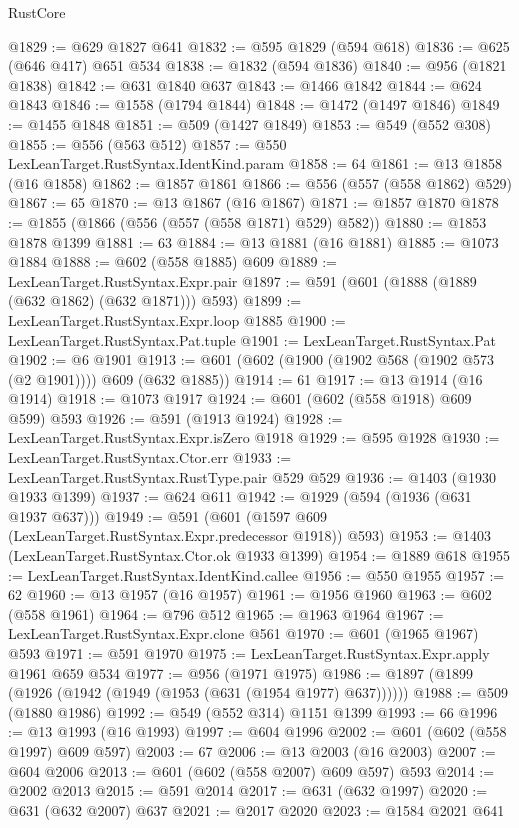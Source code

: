 \begin{lexlean}{RustCore}
\begin{coremodule}
@1829 := @629 @1827 @641
@1832 := @595 @1829 (@594 @618)
@1836 := @625 (@646 @417) @651 @534
@1838 := @1832 (@594 @1836)
@1840 := @956 (@1821 @1838)
@1842 := @631 @1840 @637
@1843 := @1466 @1842
@1844 := @624 @1843
@1846 := @1558 (@1794 @1844)
@1848 := @1472 (@1497 @1846)
@1849 := @1455 @1848
@1851 := @509 (@1427 @1849)
@1853 := @549 (@552 @308)
@1855 := @556 (@563 @512)
@1857 := @550 LexLeanTarget.RustSyntax.IdentKind.param
@1858 := 64
@1861 := @13 @1858 (@16 @1858)
@1862 := @1857 @1861
@1866 := @556 (@557 (@558 @1862) @529)
@1867 := 65
@1870 := @13 @1867 (@16 @1867)
@1871 := @1857 @1870
@1878 := @1855 (@1866 (@556 (@557 (@558 @1871) @529) @582))
@1880 := @1853 @1878 @1399
@1881 := 63
@1884 := @13 @1881 (@16 @1881)
@1885 := @1073 @1884
@1888 := @602 (@558 @1885) @609
@1889 := LexLeanTarget.RustSyntax.Expr.pair
@1897 := @591 (@601 (@1888 (@1889 (@632 @1862) (@632 @1871))) @593)
@1899 := LexLeanTarget.RustSyntax.Expr.loop @1885
@1900 := LexLeanTarget.RustSyntax.Pat.tuple
@1901 := LexLeanTarget.RustSyntax.Pat
@1902 := @6 @1901
@1913 := @601 (@602 (@1900 (@1902 @568 (@1902 @573 (@2 @1901)))) @609 (@632 @1885))
@1914 := 61
@1917 := @13 @1914 (@16 @1914)
@1918 := @1073 @1917
@1924 := @601 (@602 (@558 @1918) @609 @599) @593
@1926 := @591 (@1913 @1924)
@1928 := LexLeanTarget.RustSyntax.Expr.isZero @1918
@1929 := @595 @1928
@1930 := LexLeanTarget.RustSyntax.Ctor.err
@1933 := LexLeanTarget.RustSyntax.RustType.pair @529 @529
@1936 := @1403 (@1930 @1933 @1399)
@1937 := @624 @611
@1942 := @1929 (@594 (@1936 (@631 @1937 @637)))
@1949 := @591 (@601 (@1597 @609 (LexLeanTarget.RustSyntax.Expr.predecessor @1918)) @593)
@1953 := @1403 (LexLeanTarget.RustSyntax.Ctor.ok @1933 @1399)
@1954 := @1889 @618
@1955 := LexLeanTarget.RustSyntax.IdentKind.callee
@1956 := @550 @1955
@1957 := 62
@1960 := @13 @1957 (@16 @1957)
@1961 := @1956 @1960
@1963 := @602 (@558 @1961)
@1964 := @796 @512
@1965 := @1963 @1964
@1967 := LexLeanTarget.RustSyntax.Expr.clone @561
@1970 := @601 (@1965 @1967) @593
@1971 := @591 @1970
@1975 := LexLeanTarget.RustSyntax.Expr.apply @1961 @659 @534
@1977 := @956 (@1971 @1975)
@1986 := @1897 (@1899 (@1926 (@1942 (@1949 (@1953 (@631 (@1954 @1977) @637))))))
@1988 := @509 (@1880 @1986)
@1992 := @549 (@552 @314) @1151 @1399
@1993 := 66
@1996 := @13 @1993 (@16 @1993)
@1997 := @604 @1996
@2002 := @601 (@602 (@558 @1997) @609 @597)
@2003 := 67
@2006 := @13 @2003 (@16 @2003)
@2007 := @604 @2006
@2013 := @601 (@602 (@558 @2007) @609 @597) @593
@2014 := @2002 @2013
@2015 := @591 @2014
@2017 := @631 (@632 @1997)
@2020 := @631 (@632 @2007) @637
@2021 := @2017 @2020
@2023 := @1584 @2021 @641

\end{coremodule}
\end{lexlean}
